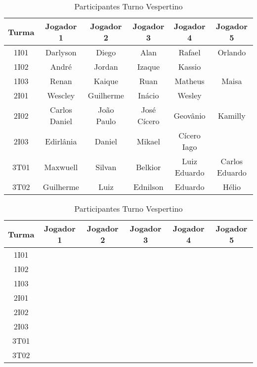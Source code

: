 \documentclass[10pt]{article}
\begin{document}
    \begin{table}[h!]
        \caption{Participantes Turno Vespertino}
        \label{tab:part-vespertino}
        \begin{center}
            \begin{tabular}{c|c|c|c|c|c}
                \hline
                \textbf{Turma} & \textbf{Jogador 1} & \textbf{Jogador 2} & \textbf{Jogador 3} & \textbf{Jogador 4} & \textbf{Jogador 5}\\ \hline
                1I01 & Darlyson & Diego & Alan & Rafael & Orlando \\
                1I02 & André & Jordan & Izaque & Kassio & \\
                1I03 & Renan & Kaique & Ruan & Matheus & Maisa \\
                2I01 & Wescley & Guilherme & Inácio & Wesley & \\
                2I02 & Carlos Daniel & João Paulo & José Cícero & Geovânio & Kamilly \\
                2I03 & Edirlânia & Daniel & Mikael & Cícero Iago \\
                3T01 & Maxwuell & Silvan & Belkior & Luiz Eduardo & Carlos Eduardo \\
                3T02 & Guilherme & Luiz & Ednilson & Eduardo & Hélio \\
                \hline
            \end{tabular}
        \end{center}
    \end{table}

    \begin{table}[h!]
        \caption{Participantes Turno Vespertino}
        \label{tab:part-matutino}
        \begin{center}
            \begin{tabular}{c|c|c|c|c|c}
                \hline
                \textbf{Turma} & \textbf{Jogador 1} & \textbf{Jogador 2} & \textbf{Jogador 3} & \textbf{Jogador 4} & \textbf{Jogador 5}\\ \hline
                1I01 & & & & & \\ \hline
                1I02 & & & & & \\ \hline
                1I03 & & & & & \\ \hline
                2I01 & & & & & \\ \hline
                2I02 & & & & & \\ \hline
                2I03 & & & & & \\ \hline
                3T01 & & & & & \\ \hline
                3T02 & & & & & \\ \hline
            \end{tabular}
        \end{center}
    \end{table}
\end{document}
